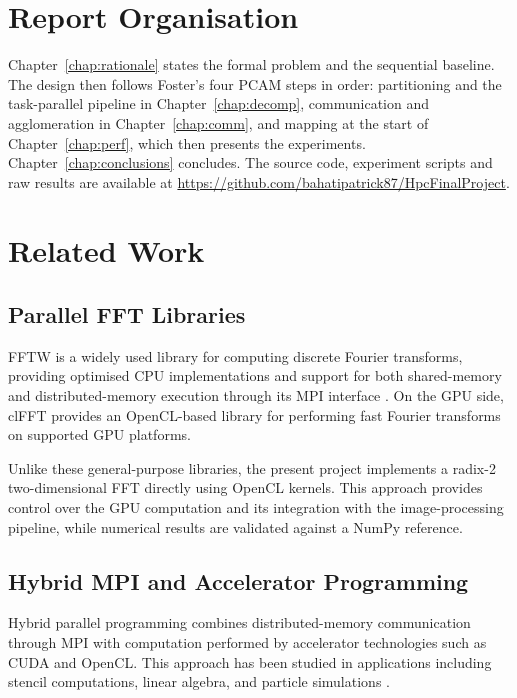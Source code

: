\documentclass[a4paper,12pt]{report}
\begin{document}
\section{Report Organisation}
\label{sec:organisation}

Chapter~\ref{chap:rationale} states the formal problem and the sequential
baseline. The design then follows Foster's four PCAM steps in order:
partitioning and the task-parallel pipeline in Chapter~\ref{chap:decomp},
communication and agglomeration in Chapter~\ref{chap:comm}, and mapping at the
start of Chapter~\ref{chap:perf}, which then presents the experiments.
Chapter~\ref{chap:conclusions} concludes.
The source code, experiment scripts and raw results are available at
\url{https://github.com/bahatipatrick87/HpcFinalProject}.

\section{Related Work}
\label{sec:related}

\subsection{Parallel FFT Libraries}

FFTW \cite{frigo2005} is a widely used library for computing discrete Fourier
transforms, providing optimised CPU implementations and support for both
shared-memory and distributed-memory execution through its MPI interface
\cite{fftwmpi}. On the GPU side, clFFT \cite{amd2014} provides an OpenCL-based
library for performing fast Fourier transforms on supported GPU platforms.

Unlike these general-purpose libraries, the present project implements a radix-2
two-dimensional FFT directly using OpenCL kernels. This approach provides control
over the GPU computation and its integration with the image-processing pipeline,
while numerical results are validated against a NumPy reference.

\subsection{Hybrid MPI and Accelerator Programming}

Hybrid parallel programming combines distributed-memory communication through MPI
with computation performed by accelerator technologies such as CUDA and OpenCL.
This approach has been studied in applications including stencil computations,
linear algebra, and particle simulations \cite{rauber2013}.
\end{document}
